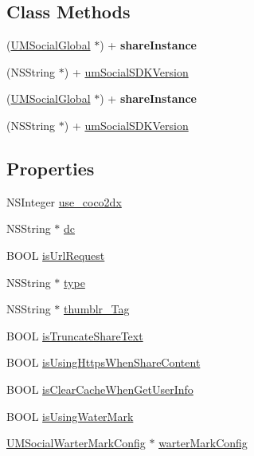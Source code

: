 \subsection*{Class Methods}
\begin{DoxyCompactItemize}
\item 
\mbox{\label{interface_u_m_social_global_a31a11a3c35bd8e5708eb409bf30eb8fd}} 
(\mbox{\hyperlink{interface_u_m_social_global}{U\+M\+Social\+Global}} $\ast$) + {\bfseries share\+Instance}
\item 
(N\+S\+String $\ast$) + \mbox{\hyperlink{interface_u_m_social_global_aec8751548bd2bced8ee8ed1556df4daf}{um\+Social\+S\+D\+K\+Version}}
\item 
\mbox{\label{interface_u_m_social_global_a31a11a3c35bd8e5708eb409bf30eb8fd}} 
(\mbox{\hyperlink{interface_u_m_social_global}{U\+M\+Social\+Global}} $\ast$) + {\bfseries share\+Instance}
\item 
(N\+S\+String $\ast$) + \mbox{\hyperlink{interface_u_m_social_global_aec8751548bd2bced8ee8ed1556df4daf}{um\+Social\+S\+D\+K\+Version}}
\end{DoxyCompactItemize}
\subsection*{Properties}
\begin{DoxyCompactItemize}
\item 
N\+S\+Integer \mbox{\hyperlink{interface_u_m_social_global_a27539eecc2695b0c55836966a1834451}{use\+\_\+coco2dx}}
\item 
N\+S\+String $\ast$ \mbox{\hyperlink{interface_u_m_social_global_ab653dcc0bca4a885061e661b8f9438ef}{dc}}
\item 
B\+O\+OL \mbox{\hyperlink{interface_u_m_social_global_ae99b7be2f3d656e8072bfaaa543b9793}{is\+Url\+Request}}
\item 
N\+S\+String $\ast$ \mbox{\hyperlink{interface_u_m_social_global_aa0c12aaf93858088d9f1420a4240fe46}{type}}
\item 
N\+S\+String $\ast$ \mbox{\hyperlink{interface_u_m_social_global_abfaa81238a9b30497d9d56e00537b072}{thumblr\+\_\+\+Tag}}
\item 
B\+O\+OL \mbox{\hyperlink{interface_u_m_social_global_a67f0d257cac0ddd5f44c6f2ef2100434}{is\+Truncate\+Share\+Text}}
\item 
B\+O\+OL \mbox{\hyperlink{interface_u_m_social_global_a1aa7d60763eb65dc2440bf474a09ce1a}{is\+Using\+Https\+When\+Share\+Content}}
\item 
B\+O\+OL \mbox{\hyperlink{interface_u_m_social_global_ae92722c8370b9297356ff9601b496b8a}{is\+Clear\+Cache\+When\+Get\+User\+Info}}
\item 
B\+O\+OL \mbox{\hyperlink{interface_u_m_social_global_a9dcc2953a61a274c330460a9fdffae44}{is\+Using\+Water\+Mark}}
\item 
\mbox{\hyperlink{interface_u_m_social_warter_mark_config}{U\+M\+Social\+Warter\+Mark\+Config}} $\ast$ \mbox{\hyperlink{interface_u_m_social_global_acda7c70bf79b614501c0a69f01f7a298}{warter\+Mark\+Config}}
\end{DoxyCompactItemize}


